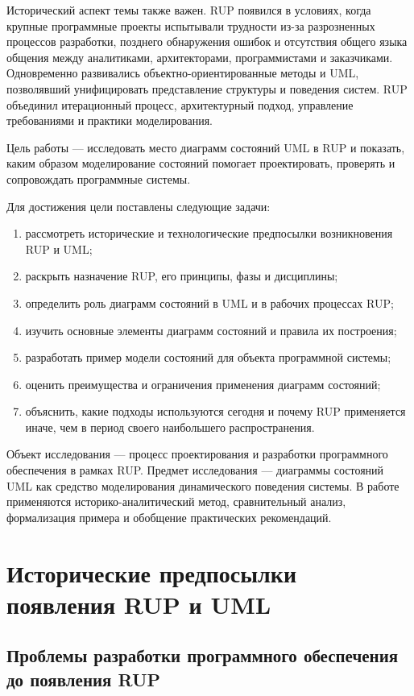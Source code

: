 \documentclass[essay,paper]{pmk-graduate}
\begin{document}
Исторический аспект темы также важен. RUP появился в условиях, когда крупные программные проекты испытывали трудности из-за разрозненных процессов разработки, позднего обнаружения ошибок и отсутствия общего языка общения между аналитиками, архитекторами, программистами и заказчиками. Одновременно развивались объектно-ориентированные методы и UML, позволявший унифицировать представление структуры и поведения систем. RUP объединил итерационный процесс, архитектурный подход, управление требованиями и практики моделирования.

Цель работы — исследовать место диаграмм состояний UML в RUP и показать, каким образом моделирование состояний помогает проектировать, проверять и сопровождать программные системы.

Для достижения цели поставлены следующие задачи:
\begin{enumerate}
  \item рассмотреть исторические и технологические предпосылки возникновения RUP и UML;
  \item раскрыть назначение RUP, его принципы, фазы и дисциплины;
  \item определить роль диаграмм состояний в UML и в рабочих процессах RUP;
  \item изучить основные элементы диаграмм состояний и правила их построения;
  \item разработать пример модели состояний для объекта программной системы;
  \item оценить преимущества и ограничения применения диаграмм состояний;
  \item объяснить, какие подходы используются сегодня и почему RUP применяется иначе, чем в период своего наибольшего распространения.
\end{enumerate}

Объект исследования — процесс проектирования и разработки программного обеспечения в рамках RUP. Предмет исследования — диаграммы состояний UML как средство моделирования динамического поведения системы. В работе применяются историко-аналитический метод, сравнительный анализ, формализация примера и обобщение практических рекомендаций.

\section{Исторические предпосылки появления RUP и UML}

\subsection{Проблемы разработки программного обеспечения до появления RUP}
\end{document}
